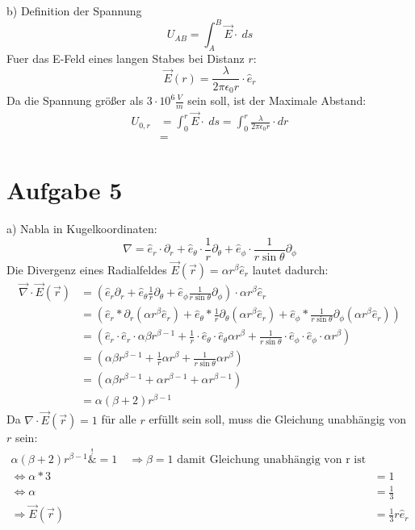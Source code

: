 \documentclass[a4paper]{article}
\newcommand{\delr}{\partial_r}
\newcommand{\delp}{\partial_\phi}
\newcommand{\delt}{\partial_\theta}
\newcommand{\er}{\hat{e}_r}
\newcommand{\et}{\hat{e}_\theta}
\newcommand{\ep}{\hat{e}_\phi}
\begin{document}
\par{b)}
Definition der Spannung
\[ U_{AB} = \int_A^B \vec{E} \cdot \ ds \]
Fuer das E-Feld eines langen Stabes bei Distanz $r$:
\[ \vec{E}(r) = \frac{\lambda}{2\pi\epsilon_0 r} \cdot \hat{e}_r \]
Da die Spannung größer als $3\cdot 10^6 \frac{V}{m}$ sein soll, ist der Maximale Abstand:
\begin{align*}
	U_{0, r} 
	&= \int_0^r \vec{E} \cdot \ ds = \int_0^r \frac{\lambda}{2\pi\epsilon_0 r} \cdot dr \\
	&= 	
\end{align*}

\newpage

\section*{Aufgabe 5}
\par{a)}
Nabla in Kugelkoordinaten:
\[ \nabla = \er \cdot \delr + \et \cdot \frac{1}{r} \delt + \ep \cdot \frac{1}{r \sin\theta} \delp \]
Die Divergenz eines Radialfeldes $\vec{E}(\vec{r}) = \alpha r^\beta \er$ lautet dadurch:
\begin{align*}
	\vec{\nabla} \cdot \vec{E}(\vec{r}) 
	&= \left(  \er \delr + \et \frac{1}{r} \delt + \ep  \frac{1}{r \sin\theta} \delp \right) \cdot \alpha r^\beta \er \\
	&= \left(\er * \delr (\alpha r^\beta \er )
		+ \et * \frac{1}{r} \delt (\alpha r^\beta \er )
		+ \ep * \frac{1}{r\sin\theta} \delp (\alpha r^\beta \er) \right) \\
	&= \left(\er \cdot \er \cdot \alpha \beta r^{\beta - 1}
		+ \frac{1}{r} \cdot \et \cdot \et \alpha r^\beta
		+ \frac{1}{r\sin\theta} \cdot \ep \cdot \ep \cdot \alpha r^\beta \right) \\
	&= \left(\alpha \beta r^{\beta - 1}
		+ \frac{1}{r} \alpha r^\beta
		+ \frac{1}{r\sin\theta}  \alpha r^\beta \right) \\
	&= \left( \alpha\beta r^{\beta - 1} +\alpha r^{\beta - 1} +\alpha r^{\beta - 1} \right) \\
	&= \alpha (\beta + 2) r^{\beta - 1}
\end{align*}
Da $\nabla \cdot \vec{E}(\vec{r}) = 1$ für alle $r$ erfüllt sein soll, muss die Gleichung unabhängig von $r$ sein:
\begin{align*}
	\alpha (\beta + 2) r^{\beta - 1} \overset{!}&{=} 1
	\quad \Rightarrow
	\beta = 1 \text{ damit Gleichung unabhängig von r ist}
	\\
	\Leftrightarrow
	\alpha * 3 &= 1 \\
	\Leftrightarrow
	\alpha &= \frac{1}{3} \\
	\Rightarrow \vec{E}(\vec{r}) &= \frac{1}{3} r \hat{e}_r
\end{align*}
\end{document}
